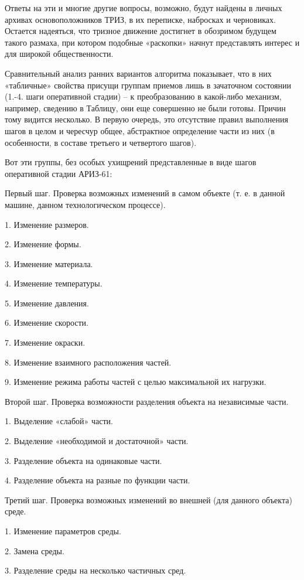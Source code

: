 \documentclass[11pt,a4paper]{article}
\begin{document}
Ответы на эти и многие другие вопросы, возможно, будут найдены в личных
архивах основоположников ТРИЗ, в их переписке, набросках и
черновиках. Остается надеяться, что тризное движение достигнет в обозримом
будущем такого размаха, при котором подобные «раскопки» начнут представлять
интерес и для широкой общественности.

Сравнительный анализ ранних вариантов алгоритма показывает, что в них
«табличные» свойства присущи группам приемов лишь в зачаточном состоянии
(1.-4. шаги оперативной стадии) -- к преобразованию в какой-либо механизм,
например, сведению в Таблицу, они еще совершенно не были готовы. Причин тому
видится несколько. В первую очередь, это отсутствие правил выполнения шагов в
целом и чересчур общее, абстрактное определение части из них (в особенности, в
составе третьего и четвертого шагов).

Вот эти группы, без особых ухищрений представленные в виде шагов оперативной
стадии АРИЗ-61:

Первый шаг. Проверка возможных изменений в самом объекте (т. е. в данной
машине, данном технологическом процессе).

1. Изменение размеров.

2. Изменение формы.

3. Изменение материала.

4. Изменение температуры.

5. Изменение давления.

6. Изменение скорости.

7. Изменение окраски.

8. Изменение взаимного расположения частей.

9. Изменение режима работы частей с целью максимальной их нагрузки.

Второй шаг. Проверка возможности разделения объекта на независимые части.

1. Выделение «слабой» части.

2. Выделение «необходимой и достаточной» части.

3. Разделение объекта на одинаковые части.

4. Разделение объекта на разные по функции части.

Третий шаг. Проверка возможных изменений во внешней (для данного объекта)
среде.

1. Изменение параметров среды.

2. Замена среды.

3. Разделение среды на несколько частичных сред.
\end{document}
